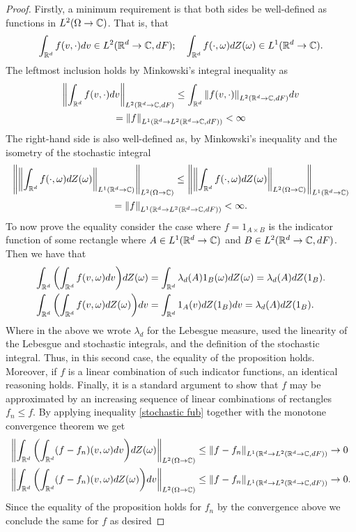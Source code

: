 \documentclass[12pt]{article}
\begin{document}
\begin{proof}
	Firstly, a minimum requirement is that both sides be well-defined as functions in $L^2(\Omega\to\mathbb{C})$. That is, that
	\begin{equation*}
		\int_{{\mathbb R}^d}f(v,\cdot)dv\in L^2({\mathbb R}^d\to\mathbb{C},dF);\quad   \int_{{\mathbb R}^d}f(\cdot,\omega)dZ(\omega)\in L^1({\mathbb R}^d\to\mathbb{C}).
	\end{equation*}
	The leftmost inclusion holds by Minkowski's integral inequality as
	\begin{multline*}
		\norm{\int_{{\mathbb R}^d}f(v,\cdot)dv}_{L^2({\mathbb R}^d\to\mathbb{C},dF)}\leq\int_{{\mathbb R}^d}\norm{f(v,\cdot)}_{L^2({\mathbb R}^d\to\mathbb{C},dF)}dv\\=\norm{f}_{L^1({\mathbb R}^d\to L^2({\mathbb R}^d\to\mathbb{C},dF))}<\infty
	\end{multline*}
	The right-hand side is also well-defined as, by Minkowski's inequality and the isometry of the stochastic integral
	\begin{multline}\label{stochastic fub}
		\norm{\norm{\int_{{\mathbb R}^d}f(\cdot,\omega)dZ(\omega)}_{L^1({\mathbb R}^d\to\mathbb{C})}}_{L^2(\Omega\to\mathbb{C})}\leq \norm{\norm{\int_{{\mathbb R}^d}f(\cdot,\omega)dZ(\omega)}_{L^2(\Omega\to\mathbb{C})}}_{L^1({\mathbb R}^d\to\mathbb{C})}\\=\norm{f}_{L^1({\mathbb R}^d\to L^2({\mathbb R}^d\to\mathbb{C},dF))}<\infty.
	\end{multline}
	To now prove the equality consider the case where $f=1_{A\times B}$ is the indicator function of some rectangle where $A\in L^1({\mathbb R}^d\to\mathbb{C})$ and $B\in L^2({\mathbb R}^d\to\mathbb{C},dF)$. Then we have that
	\begin{align*}
		\int_{{\mathbb R}^d}\qty(\int_{{\mathbb R}^d}f(v,\omega)dv)dZ(\omega) & =\int_{{\mathbb R}^d}\lambda_d(A)1_B(\omega) dZ(\omega)=\lambda_d(A)dZ(1_B). \\
		\int_{{\mathbb R}^d}\qty(\int_{{\mathbb R}^d}f(v,\omega)dZ(\omega))dv & = \int_{{\mathbb R}^d}1_A(v)dZ(1_B)dv=\lambda_d(A)dZ(1_B).
	\end{align*}
	Where in the above we wrote $\lambda_d$ for the Lebesgue measure, used the linearity of the Lebesgue and stochastic integrals, and the definition of the stochastic integral. Thus, in this second case, the equality of the proposition holds. Moreover, if $f$ is a linear combination of such indicator functions, an identical reasoning holds. Finally, it is a standard argument to show that $f$ may be approximated by an increasing sequence of linear combinations of rectangles  $f_n\leq f$. By applying inequality \eqref{stochastic fub} together with the monotone convergence theorem we get
	\begin{align*}
		\norm{\int_{{\mathbb R}^d}\qty(\int_{{\mathbb R}^d}(f-f_n)(v,\omega)dv)dZ(\omega)}_{L^2(\Omega\to\mathbb{C})} & \leq\norm{f-f_n}_{L^1({\mathbb R}^d\to L^2({\mathbb R}^d\to\mathbb{C},dF))}\to 0 \\\norm{\int_{{\mathbb R}^d}\qty(\int_{{\mathbb R}^d}(f-f_n)(v,\omega)dZ(\omega))dv}_{L^2(\Omega\to\mathbb{C})}&\leq\norm{f-f_n}_{L^1({\mathbb R}^d\to L^2({\mathbb R}^d\to\mathbb{C},dF))}\to 0.
	\end{align*}
	Since the equality of the proposition holds for $f_n$ by the convergence above we conclude the same for  $f$ as desired
\end{proof}
\end{document}
